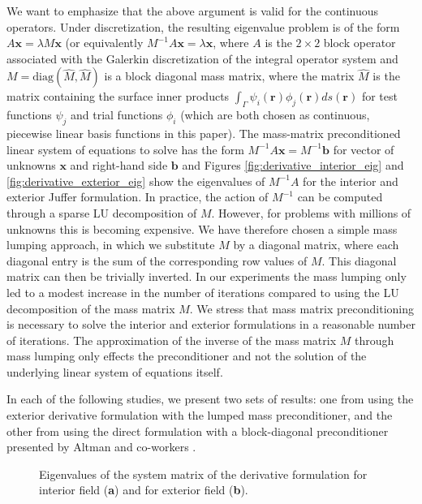 We want to emphasize that the above argument is valid for the continuous operators. Under discretization, the resulting eigenvalue problem is of the form $A\mathbf{x}=\lambda M\mathbf{x}$ (or equivalently $M^{-1}A\mathbf{x}=\lambda \mathbf{x}$, where $A$ is the $2\times 2$ block operator associated with the Galerkin discretization of the integral operator system and $M = \text{diag}(\hat{M}, \hat{M})$ is a block diagonal mass matrix, where the matrix $\hat{M}$ is the matrix containing the surface inner products $\int_{\Gamma}\psi_i(\mathbf{r})\phi_j(\mathbf{r})ds(\mathbf{r})$ for test functions $\psi_j$ and trial functions $\phi_i$ (which are both chosen as continuous, piecewise linear basis functions in this paper). The mass-matrix preconditioned linear system of equations to solve has the form $M^{-1}A\mathbf{x} = M^{-1}\mathbf{b}$ for vector of unknowns $\mathbf{x}$ and right-hand side $\mathbf{b}$ and Figures \ref{fig:derivative_interior_eig} and \ref{fig:derivative_exterior_eig} show the eigenvalues of $M^{-1}A$ for the interior and exterior Juffer formulation. In practice, the action of $M^{-1}$ can be computed through a sparse LU decomposition of $M$. However, for problems with millions of unknowns this is becoming expensive. We have therefore chosen a simple mass lumping approach, in which we substitute $M$ by a diagonal matrix, where each diagonal entry is the sum of the corresponding row values of $M$. This diagonal matrix can then be trivially inverted. In our experiments the mass lumping only led to a modest increase in the number of iterations compared to using the LU decomposition of the mass matrix $M$. We stress that mass matrix preconditioning is necessary to solve the interior and exterior formulations in a reasonable number of iterations. The approximation of the inverse of the mass matrix $M$ through mass lumping only effects the preconditioner and not the solution of the underlying linear system of equations itself. 

In each of the following studies, we present two sets of results: one from using the exterior derivative formulation with the lumped mass preconditioner, and the other from using the direct formulation with a block-diagonal preconditioner presented by Altman and co-workers \cite{AltmanBardhanWhiteTidor2009}.


\begin{figure*}
    \begin{center}
        \qquad
    \end{center}
    \caption{Eigenvalues of the system matrix of the derivative formulation for interior field (\textbf{a}) and for exterior field (\textbf{b}).
    }
\end{figure*}

